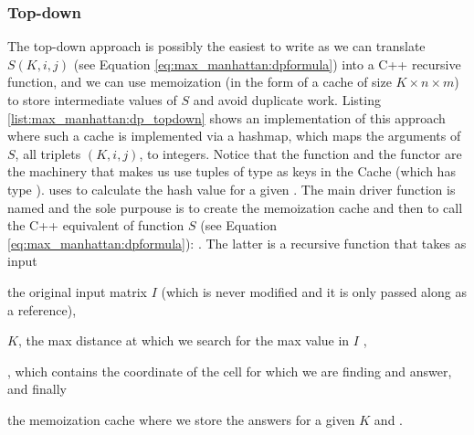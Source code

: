 \subsubsection{Top-down}
\label{sec:max_manhattan:topdown}
The top-down approach is possibly the easiest to write as we can  translate $S(K,i,j)$ (see Equation
\ref{eq:max_manhattan:dpformula}) into a C++ recursive function, and we can use memoization (in the
form of a cache of size $K\times n\times m$) to store intermediate values of $S$ and avoid duplicate
work. Listing \ref{list:max_manhattan:dp_topdown} shows an implementation of this approach where
such a cache is implemented via a hashmap, which maps the arguments of $S$, all triplets $(K,i,j)$,
to integers. Notice that the function  and the functor  are
the machinery that makes us use tuples of type  as keys in the Cache
(which has type ).  uses  to
calculate the hash value for a given . The main driver function is
named  and the sole purpouse is to create the
memoization cache and then to call the C++ equivalent of function $S$ (see Equation
\ref{eq:max_manhattan:dpformula}): . The
latter is a recursive function that takes as input
\begin{enumerate*}
    \item the original input matrix $I$ (which is never modified and it is only passed along as a
    reference),
    \item $K$, the max distance at which we search for the max value in $I$ ,
    \item {}, which contains the coordinate of the cell for which we are finding and
    answer, and finally
    \item the memoization cache where we store the answers for a given $K$ and .
\end{enumerate*}


